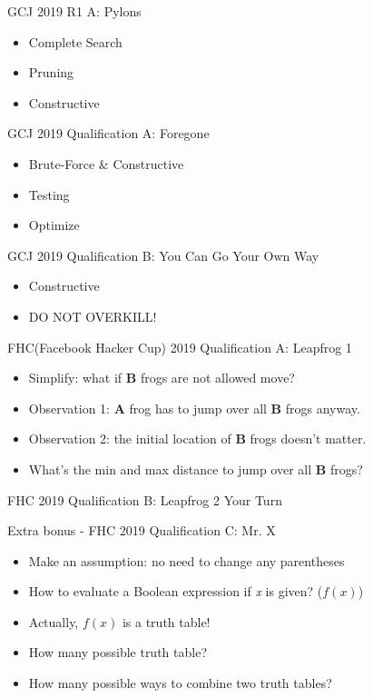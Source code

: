 \begin{frame}{GCJ 2019 R1 A: Pylons}
\begin{itemize}
  \item Complete Search
  \item Pruning
  \item Constructive
\end{itemize}
\end{frame}

\begin{frame}{GCJ 2019 Qualification A: Foregone}
\begin{itemize}
  \item Brute-Force \& Constructive
  \item Testing
  \item Optimize
\end{itemize}
\end{frame}

\begin{frame}{GCJ 2019 Qualification B: You Can Go Your Own Way}
\begin{itemize}
  \item Constructive
  \item \Large {DO NOT OVERKILL!}
\end{itemize}
\end{frame}

\begin{frame}{FHC(Facebook Hacker Cup) 2019 Qualification A: Leapfrog 1}
\begin{itemize}
  \item Simplify: what if \textbf{B} frogs are not allowed move?
  \item Observation 1: \textbf{A} frog has to jump over all \textbf{B} frogs anyway.
  \item Observation 2: the initial location of \textbf{B} frogs doesn't matter.
  \item What's the min and max distance to jump over all \textbf{B} frogs?
\end{itemize}
\end{frame}


\begin{frame}{FHC 2019 Qualification B: Leapfrog 2}
  \centering
  \Huge {Your Turn}
\end{frame}


\begin{frame}{Extra bonus - FHC 2019 Qualification C: Mr. X}
\begin{itemize}
  \item Make an assumption: no need to change any parentheses
  \item How to evaluate a Boolean expression if \textit{x} is given? ($f(x)$)
  \item Actually, $f(x)$ is a truth table!
  \item How many possible truth table?
  \item How many possible ways to combine two truth tables?
\end{itemize}
\end{frame}
